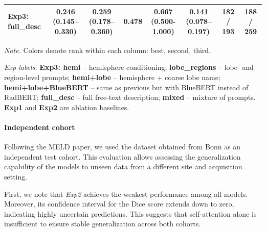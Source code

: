 \documentclass[a4paper,12pt]{article}
\begin{document}
\begin{table}[ht]
\begin{threeparttable}
\begin{tabular}{lccccccc}
Exp3: full\_desc &
\makecell{\colorbox{orange!20}{0.246}\\(0.145--0.330)} &
\makecell{\colorbox{blue!20}{0.259}\\(0.178--0.360)} &
\colorbox{orange!20}{0.478} &
\makecell{0.667 \\ (0.500-1.000)} &
\makecell{\colorbox{orange!20}{0.141}\\(0.078--0.197)} &
182 / 193 &
\colorbox{orange!20}{188 / 259} \\

\bottomrule
\end{tabular}

\begin{tablenotes}[flushleft]
\footnotesize
\item \textit{Note.} Colors denote rank within each column:
\colorbox{green!20}{best}, \colorbox{blue!20}{second}, \colorbox{orange!20}{third}.
\item \textit{Exp labels.} \textbf{Exp3: hemi} -- hemisphere conditioning; 
\textbf{lobe\_regions} -- lobe- and region-level prompts; 
\textbf{hemi+lobe} -- hemisphere + coarse lobe name; 
\textbf{hemi+lobe+BlueBERT} -- same as previous but with BlueBERT instead of RadBERT; 
\textbf{full\_desc} -- full free-text description; 
\textbf{mixed} -- mixture of prompts. 
\textbf{Exp1} and \textbf{Exp2} are ablation baselines.
\end{tablenotes}

\end{threeparttable}

\end{table}

\paragraph{Independent cohort}
Following the MELD paper, we used the dataset obtained from Bonn as an independent test cohort. 
This evaluation allows assessing the generalization capability of the models to unseen data from a different site and acquisition setting.

First, we note that \textit{Exp2} achieves the weakest performance among all models. 
Moreover, its confidence interval for the Dice score extends down to zero, indicating highly uncertain predictions. 
This suggests that self-attention alone is insufficient to ensure stable generalization across both cohorts.
\end{document}
